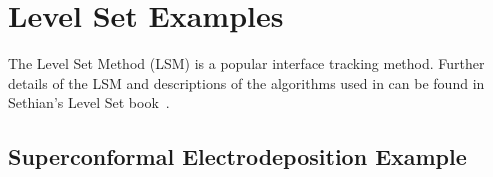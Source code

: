 \documentclass[letterpaper]{book}
\begin{document}





% 
% 
% 
% 



% 



\chapter{Level Set Examples}

The Level Set Method (LSM) is a popular interface tracking
method. Further details of the LSM and descriptions of the algorithms
used in \FiPy{} can be found in Sethian's Level Set
book~\cite{levelSetBook}.


% 

% 



\newpage
\section*{Superconformal Electrodeposition Example}
\end{document}
